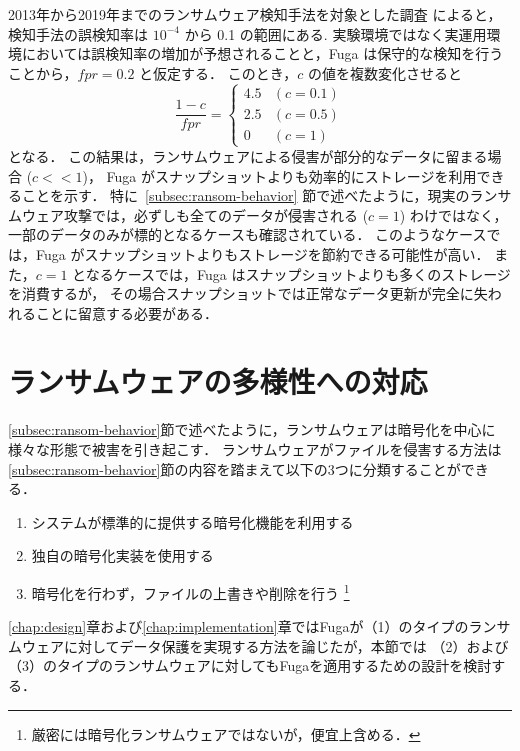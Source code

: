 2013年から2019年までのランサムウェア検知手法を対象とした調査\cite{berrueta2019survey} によると，
検知手法の誤検知率は \(10^{-4}\) から 0.1 の範囲にある.
実験環境ではなく実運用環境においては誤検知率の増加が予想されることと，Fuga は保守的な検知を行うことから，\(fpr = 0.2\) と仮定する．
このとき，\(c\) の値を複数変化させると
\begin{equation}
  \frac{1-c}{fpr} =
  \begin{cases}
    4.5 & (c = 0.1) \\
    2.5 & (c = 0.5) \\
    0   & (c = 1)
  \end{cases}
\end{equation}
となる．
この結果は，ランサムウェアによる侵害が部分的なデータに留まる場合 (\(c << 1\))，
Fuga がスナップショットよりも効率的にストレージを利用できることを示す．
特に~\ref{subsec:ransom-behavior} 節で述べたように，現実のランサムウェア攻撃では，必ずしも全てのデータが侵害される (\(c = 1\)) わけではなく，
一部のデータのみが標的となるケースも確認されている．
このようなケースでは，Fuga がスナップショットよりもストレージを節約できる可能性が高い．
また，\(c = 1\) となるケースでは，Fuga はスナップショットよりも多くのストレージを消費するが，
その場合スナップショットでは正常なデータ更新が完全に失われることに留意する必要がある．





\section{ランサムウェアの多様性への対応}
\ref{subsec:ransom-behavior}節で述べたように，ランサムウェアは暗号化を中心に様々な形態で被害を引き起こす．
ランサムウェアがファイルを侵害する方法は\ref{subsec:ransom-behavior}節の内容を踏まえて以下の3つに分類することができる．
\begin{enumerate}
  \item システムが標準的に提供する暗号化機能を利用する
  \item 独自の暗号化実装を使用する
  \item 暗号化を行わず，ファイルの上書きや削除を行う \footnote{厳密には暗号化ランサムウェアではないが，便宜上含める．}
\end{enumerate}
\ref{chap:design}章および\ref{chap:implementation}章ではFugaが（1）のタイプのランサムウェアに対してデータ保護を実現する方法を論じたが，本節では
（2）および（3）のタイプのランサムウェアに対してもFugaを適用するための設計を検討する．

